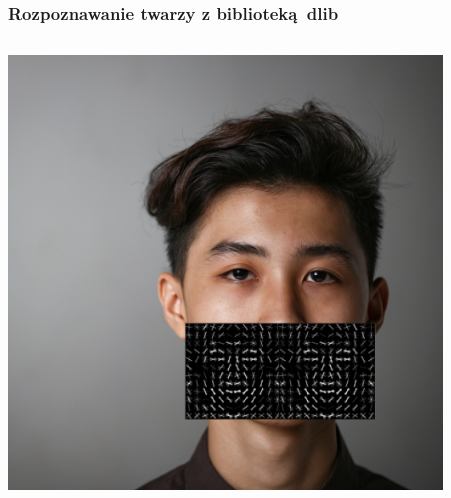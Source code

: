 \documentclass{beamer}
\begin{document}
\begin{frame}
\begin{columns}
\begin{column}{0.5\textwidth}
\begin{center}
                        \end{center}
                    \end{column}
                \end{columns}
            \end{frame}

            \begin{frame}
                \frametitle{Rozpoznawanie twarzy z biblioteką dlib}
                \begin{columns}
                    \begin{column}{0.5\textwidth}
                        \begin{center}
                            \includegraphics[width=0.9\textwidth]{pictures/face_unsplash_two_hogs}
                        \end{center}
                    \end{column}
                    \begin{column}{0.5\textwidth}
                        \begin{center}

\end{center}
\end{column}
\end{columns}
\end{frame}
\end{document}

